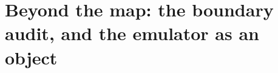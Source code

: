 %
%

\section{Beyond the map: the boundary audit, and the emulator as an object}
\label{part:beyond}

